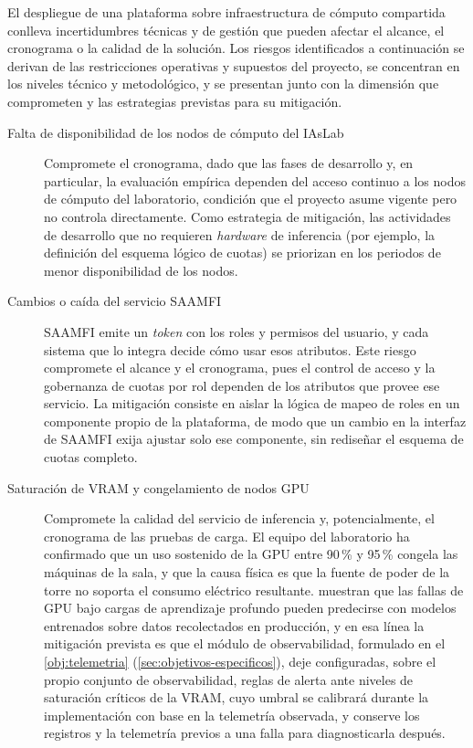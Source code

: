 El despliegue de una plataforma sobre infraestructura de cómputo compartida conlleva incertidumbres técnicas y de gestión que pueden afectar el alcance, el cronograma o la calidad de la solución. Los riesgos identificados a continuación se derivan de las restricciones operativas y supuestos del proyecto, se concentran en los niveles técnico y metodológico, y se presentan junto con la dimensión que comprometen y las estrategias previstas para su mitigación.

\begin{description}
  \item[Falta de disponibilidad de los nodos de cómputo del IAsLab] Compromete el cronograma, dado que las fases de desarrollo y, en particular, la evaluación empírica dependen del acceso continuo a los nodos de cómputo del laboratorio, condición que el proyecto asume vigente pero no controla directamente. Como estrategia de mitigación, las actividades de desarrollo que no requieren \emph{hardware} de inferencia (por ejemplo, la definición del esquema lógico de cuotas) se priorizan en los periodos de menor disponibilidad de los nodos.
  \item[Cambios o caída del servicio SAAMFI] SAAMFI emite un \emph{token} con los roles y permisos del usuario, y cada sistema que lo integra decide cómo usar esos atributos. Este riesgo compromete el alcance y el cronograma, pues el control de acceso y la gobernanza de cuotas por rol dependen de los atributos que provee ese servicio. La mitigación consiste en aislar la lógica de mapeo de roles en un componente propio de la plataforma, de modo que un cambio en la interfaz de SAAMFI exija ajustar solo ese componente, sin rediseñar el esquema de cuotas completo.
  \item[Saturación de VRAM y congelamiento de nodos GPU] Compromete la calidad del servicio de inferencia y, potencialmente, el cronograma de las pruebas de carga. El equipo del laboratorio ha confirmado que un uso sostenido de la GPU entre 90\,\% y 95\,\% congela las máquinas de la sala, y que la causa física es que la fuente de poder de la torre no soporta el consumo eléctrico resultante. \citet{liu-gpufailureprediction-2023} muestran que las fallas de GPU bajo cargas de aprendizaje profundo pueden predecirse con modelos entrenados sobre datos recolectados en producción, y en esa línea la mitigación prevista es que el módulo de observabilidad, formulado en el \cref{obj:telemetria} (\cref{sec:objetivos-especificos}), deje configuradas, sobre el propio conjunto de observabilidad, reglas de alerta ante niveles de saturación críticos de la VRAM, cuyo umbral se calibrará durante la implementación con base en la telemetría observada, y conserve los registros y la telemetría previos a una falla para diagnosticarla después.

\end{description}
